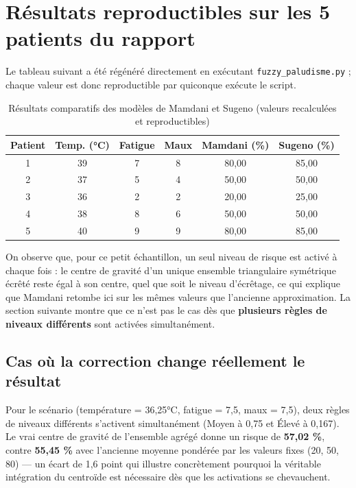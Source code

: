 \documentclass[a4paper,12pt]{report} %
\begin{document}
\section{Résultats reproductibles sur les 5 patients du rapport}

Le tableau suivant a été régénéré directement en exécutant \texttt{fuzzy\_paludisme.py} ; chaque valeur est donc reproductible par quiconque exécute le script.

\begin{table}[H]
\centering
\caption{Résultats comparatifs des modèles de Mamdani et Sugeno (valeurs recalculées et reproductibles)}
\begin{tabular}{|c|c|c|c|c|c|}
\hline
\textbf{Patient} & \textbf{Temp. (°C)} & \textbf{Fatigue} & \textbf{Maux} & \textbf{Mamdani (\%)} & \textbf{Sugeno (\%)} \\
\hline
1 & 39 & 7 & 8 & 80,00 & 85,00 \\
2 & 37 & 5 & 4 & 50,00 & 50,00 \\
3 & 36 & 2 & 2 & 20,00 & 25,00 \\
4 & 38 & 8 & 6 & 50,00 & 50,00 \\
5 & 40 & 9 & 9 & 80,00 & 85,00 \\
\hline
\end{tabular}
\end{table}

On observe que, pour ce petit échantillon, un seul niveau de risque est activé à chaque fois : le centre de gravité d'un unique ensemble triangulaire symétrique écrêté reste égal à son centre, quel que soit le niveau d'écrêtage, ce qui explique que Mamdani retombe ici sur les mêmes valeurs que l'ancienne approximation. La section suivante montre que ce n'est pas le cas dès que \textbf{plusieurs règles de niveaux différents} sont activées simultanément.

\subsection{Cas où la correction change réellement le résultat}

Pour le scénario (température = 36,25°C, fatigue = 7,5, maux = 7,5), deux règles de niveaux différents s'activent simultanément (Moyen à 0,75 et Élevé à 0,167). Le vrai centre de gravité de l'ensemble agrégé donne un risque de \textbf{57,02 \%}, contre \textbf{55,45 \%} avec l'ancienne moyenne pondérée par les valeurs fixes (20, 50, 80) — un écart de 1,6 point qui illustre concrètement pourquoi la véritable intégration du centroïde est nécessaire dès que les activations se chevauchent.
\end{document}
